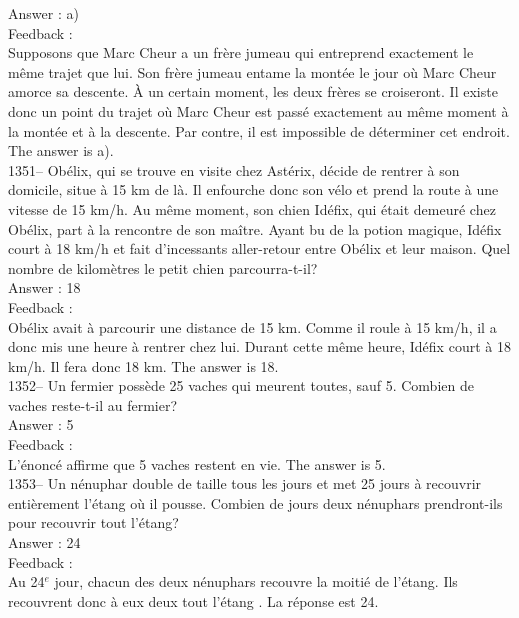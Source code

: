 ﻿\documentclass[letterpaper, 12pt]{article}
\begin{document}
Answer : a)\\

Feedback : \\
Supposons que Marc Cheur a un fr\`ere jumeau qui entreprend exactement le
m\^eme trajet que lui.  Son fr\`ere jumeau entame la mont\'ee le jour o\`u
Marc Cheur amorce sa descente.  \`A un certain moment, les deux fr\`eres se
croiseront.  Il existe donc un point du trajet o\`u Marc Cheur est pass\'e
exactement au m\^eme moment \`a la mont\'ee et \`a la descente.  Par contre,
il est impossible de d\'eterminer cet endroit.  The answer is a).\\

1351-- Ob\'elix, qui se trouve en visite chez Ast\'erix, d\'ecide de rentrer
\`a son domicile, situe \`a 15 km de l\`a. Il enfourche donc son v\'elo et
prend la route \`a une vitesse de 15 km/h.  Au m\^eme moment, son chien
Id\'efix, qui \'etait demeur\'e chez Ob\'elix, part \`a la rencontre de son
ma\^itre.  Ayant bu de la potion magique, Id\'efix court \`a 18 km/h et fait
d'incessants aller-retour entre Ob\'elix et leur maison.  Quel nombre de
kilom\`etres le petit chien parcourra-t-il?\\

Answer : 18\\

Feedback : \\
Ob\'elix avait \`a parcourir une distance de 15 km.  Comme il roule \`a 15
km/h, il a donc mis une heure \`a rentrer chez lui.  Durant cette m\^eme
heure, Id\'efix court \`a 18 km/h. Il fera donc 18 km.  The answer is
18.\\

1352-- Un fermier poss\`ede 25 vaches qui meurent toutes, sauf 5.  Combien
de vaches reste-t-il au fermier?\\

Answer : 5\\

Feedback :\\
L'\'enonc\'e affirme que 5 vaches restent en vie.  The answer is
5.\\

1353-- Un n\'enuphar double de taille tous les jours et met 25 jours \`a
recouvrir enti\`erement l'\'etang o\`u il pousse.  Combien de jours deux
n\'enuphars prendront-ils pour recouvrir tout l'\'etang?\\

Answer : 24\\

Feedback : \\
Au 24$^e$ jour, chacun des deux n\'enuphars recouvre la moiti\'e de
l'\'etang.  Ils recouvrent donc \`a eux deux tout l'\'etang . La r\'eponse
est 24.  \\
\end{document}
